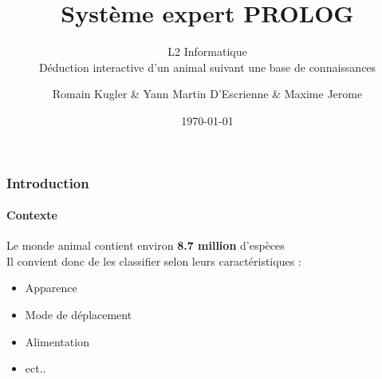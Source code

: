 \documentclass[10pt]{beamer}
\begin{document}
\title{\huge Système expert PROLOG}
	\subtitle{\Large L2 Informatique \\
	Déduction interactive d'un animal suivant une base de connaissances }
	\author {Romain Kugler \& Yann Martin D'Escrienne \& Maxime Jerome}
	\date{\today}
	
\begin{frame} \titlepage \end{frame}

\begin{frame}
	\frametitle{\textbf {\Large Introduction}}
	\framesubtitle{\large Contexte}
	
	\begin{block}{}
	Le monde animal contient environ \textbf{8.7 million} d'espèces\\
	\smallskip
	Il convient donc de les classifier selon leurs caractéristiques :
	\medskip
	\begin{itemize}	
		\item Apparence\\
		\item Mode de déplacement\\
		\item Alimentation\\
		\item ect..
	\end{itemize}
	
	\end{block}	
\end{frame}
\end{document}
